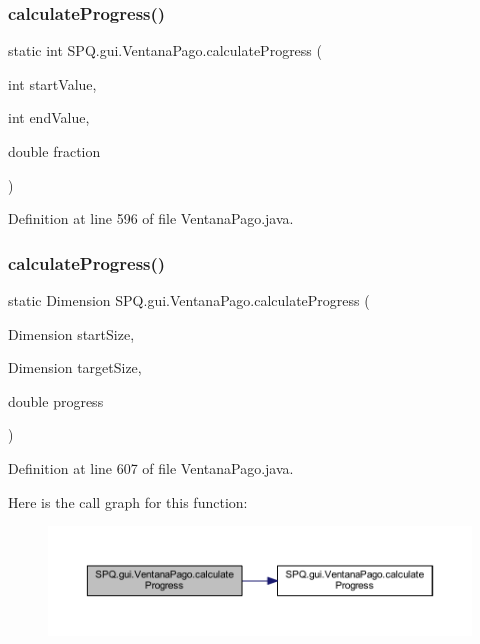 \subsubsection{\texorpdfstring{calculate\+Progress()}{calculateProgress()}\hspace{0.1cm}{\footnotesize\ttfamily [3/4]}}
{\footnotesize\ttfamily static int S\+P\+Q.\+gui.\+Ventana\+Pago.\+calculate\+Progress (\begin{DoxyParamCaption}\item[{int}]{start\+Value,  }\item[{int}]{end\+Value,  }\item[{double}]{fraction }\end{DoxyParamCaption})\hspace{0.3cm}{\ttfamily [static]}}



Definition at line 596 of file Ventana\+Pago.\+java.

\mbox{\label{class_s_p_q_1_1gui_1_1_ventana_pago_a40ab2ece25e6d7c17d9704d5172be76c}} 
\subsubsection{\texorpdfstring{calculate\+Progress()}{calculateProgress()}\hspace{0.1cm}{\footnotesize\ttfamily [4/4]}}
{\footnotesize\ttfamily static Dimension S\+P\+Q.\+gui.\+Ventana\+Pago.\+calculate\+Progress (\begin{DoxyParamCaption}\item[{Dimension}]{start\+Size,  }\item[{Dimension}]{target\+Size,  }\item[{double}]{progress }\end{DoxyParamCaption})\hspace{0.3cm}{\ttfamily [static]}}



Definition at line 607 of file Ventana\+Pago.\+java.

Here is the call graph for this function\+:
\nopagebreak
\begin{figure}[H]
\begin{center}
\leavevmode
\includegraphics[width=350pt]{class_s_p_q_1_1gui_1_1_ventana_pago_a40ab2ece25e6d7c17d9704d5172be76c_cgraph}
\end{center}
\end{figure}


